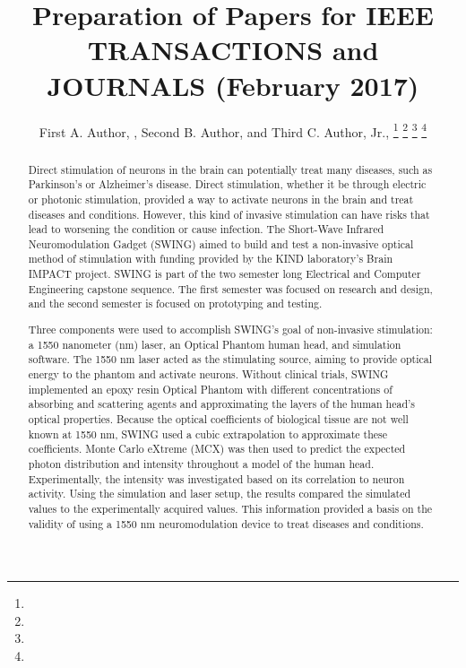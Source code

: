 \documentclass[journal,twoside,web]{ieeecolor}
\begin{document}
\title{Preparation of Papers for IEEE TRANSACTIONS and JOURNALS (February 2017)}
\author{First A. Author, , Second B. Author, and Third C. Author, Jr., 
\thanks{ }
\thanks{ }
\thanks{ }
\thanks{ }}

\maketitle

\begin{abstract}
Direct stimulation of neurons in the brain can potentially treat many diseases, such as Parkinson's 
or Alzheimer's disease. Direct stimulation, whether it be through electric or photonic stimulation, 
provided a way to activate neurons in the brain and treat diseases and conditions. However, this kind 
of invasive stimulation can have risks that lead to worsening the condition or cause infection. 
The Short-Wave Infrared Neuromodulation Gadget (SWING) aimed to build and test a non-invasive optical method 
of stimulation with funding provided by the KIND laboratory's Brain IMPACT project. SWING is part of the 
two semester long Electrical and Computer Engineering capstone sequence. The first semester was focused on research 
and design, and the second semester is focused on prototyping and testing.

Three components were used to accomplish SWING's goal of non-invasive stimulation: a 1550 nanometer (nm) laser, 
an Optical Phantom human head, and simulation software. The 1550 nm laser acted as the stimulating source, 
aiming to provide optical energy to the phantom and activate neurons. Without clinical trials, SWING implemented an epoxy resin 
Optical Phantom with different concentrations of absorbing and scattering agents and approximating the layers of the human head's 
optical properties. Because the optical coefficients of biological tissue are not well known at 1550 nm, 
SWING used a cubic extrapolation to approximate these coefficients. Monte Carlo eXtreme (MCX) was then used to predict the 
expected photon distribution and intensity throughout a model of the human head. Experimentally, the intensity was investigated 
based on its correlation to neuron activity. Using the simulation and laser setup, the results compared the simulated values to the 
experimentally acquired values. This information provided a basis on the validity of using a 1550 nm neuromodulation device to treat 
diseases and conditions.
\end{abstract}
\end{document}
